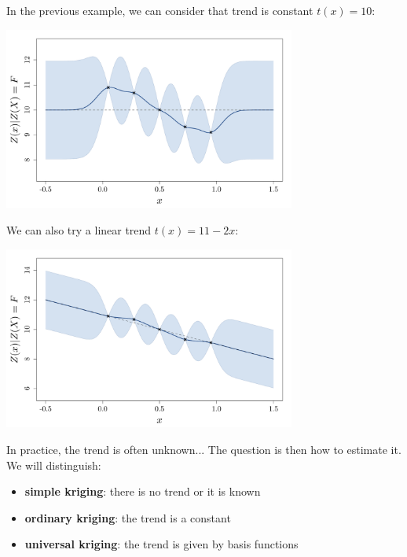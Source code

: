 \documentclass{beamer}
\begin{document}
\begin{frame}{}
In the previous example, we can consider that trend is constant $t(x)=10$:
\begin{center}
	\includegraphics[height=6cm]{figures/R/trend_knowncst}
\end{center}
\end{frame}

\begin{frame}{}
We can also try a linear trend $t(x)=11-2x$:
\begin{center}
	\includegraphics[height=6cm]{figures/R/trend_knownlin}
\end{center}
\end{frame}

\begin{frame}{}
In practice, the trend is often unknown... The question is then how to estimate it.\\ \vspace{5mm} 
We will distinguish:
\begin{itemize}
	\item \textbf{simple kriging}: there is no trend or it is known
	\item \textbf{ordinary kriging}: the trend is a constant
	\item \textbf{universal kriging}: the trend is given by basis functions
\end{itemize}
\end{frame}
\end{document}
